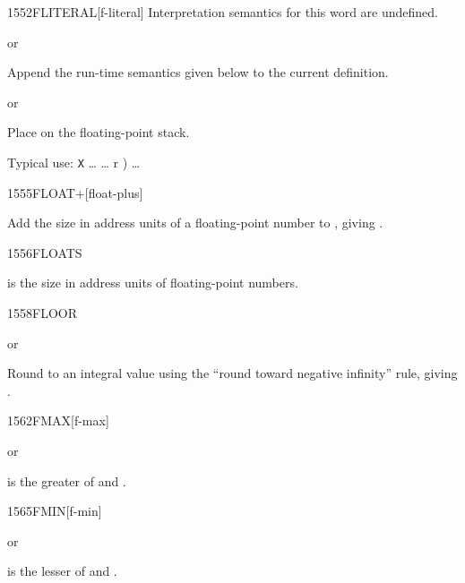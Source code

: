 \begin{worddef}{1552}{FLITERAL}[f-literal]
\interpret
	Interpretation semantics for this word are undefined.

\compile
	 or

	Append the run-time semantics given below to the current
	definition.

\runtime
	 or

	Place  on the floating-point stack.

	\begin{rationale} %
		Typical use:
			\word[core]{:} \texttt{X} {\ldots}
				\word[core]{[} {\ldots}  r ) \word[core]{]}
				 {\ldots}
			\word[core]{;}
	\end{rationale}
\end{worddef}


\begin{worddef}{1555}{FLOAT+}[float-plus]
\item {}

	Add the size in address units of a floating-point number to
	, giving .
\end{worddef}


\begin{worddef}{1556}{FLOATS}
\item {}

	 is the size in address units of  floating-point
	numbers.
\end{worddef}


\begin{worddef}{1558}{FLOOR}
\item {} or

	Round  to an integral value using the ``round toward
	negative infinity'' rule, giving .

\end{worddef}


\begin{worddef}{1562}{FMAX}[f-max]
\item {} or

	 is the greater of  and .
\end{worddef}


\begin{worddef}{1565}{FMIN}[f-min]
\item {} or

	 is the lesser of  and .
\end{worddef}


